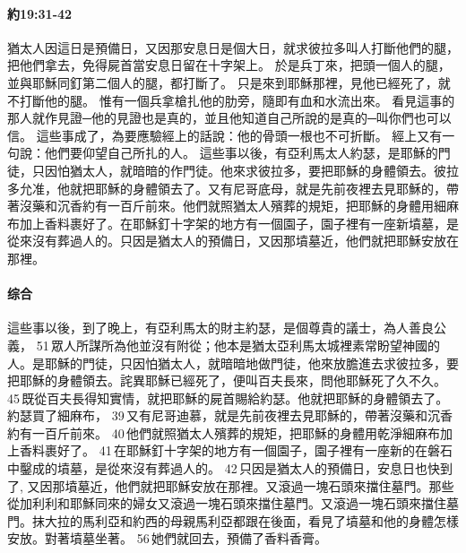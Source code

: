 \paragraph{約19:31-42}
猶太人因這日是預備日，又因那安息日是個大日，就求彼拉多叫人打斷他們的腿，把他們拿去，免得屍首當安息日留在十字架上。
於是兵丁來，把頭一個人的腿，並與耶穌同釘第二個人的腿，都打斷了。
只是來到耶穌那裡，見他已經死了，就不打斷他的腿。
惟有一個兵拿槍扎他的肋旁，隨即有血和水流出來。
看見這事的那人就作見證─他的見證也是真的，並且他知道自己所說的是真的─叫你們也可以信。
這些事成了，為要應驗經上的話說：他的骨頭一根也不可折斷。
經上又有一句說：他們要仰望自己所扎的人。
這些事以後，有亞利馬太人約瑟，是耶穌的門徒，只因怕猶太人，就暗暗的作門徒。他來求彼拉多，要把耶穌的身體領去。彼拉多允准，他就把耶穌的身體領去了。又有尼哥底母，就是先前夜裡去見耶穌的，帶著沒藥和沉香約有一百斤前來。他們就照猶太人殯葬的規矩，把耶穌的身體用細麻布加上香料裹好了。在耶穌釘十字架的地方有一個園子，園子裡有一座新墳墓，是從來沒有葬過人的。只因是猶太人的預備日，又因那墳墓近，他們就把耶穌安放在那裡。
\paragraph{综合}
這些事以後，到了晚上，有亞利馬太的財主約瑟，是個尊貴的議士，為人善良公義， 51 眾人所謀所為他並沒有附從；他本是猶太亞利馬太城裡素常盼望神國的人。是耶穌的門徒，只因怕猶太人，就暗暗地做門徒，他來放膽進去求彼拉多，要把耶穌的身體領去。詫異耶穌已經死了，便叫百夫長來，問他耶穌死了久不久。 45 既從百夫長得知實情，就把耶穌的屍首賜給約瑟。他就把耶穌的身體領去了。約瑟買了細麻布， 39 又有尼哥迪慕，就是先前夜裡去見耶穌的，帶著沒藥和沉香約有一百斤前來。 40 他們就照猶太人殯葬的規矩，把耶穌的身體用乾淨細麻布加上香料裹好了。 41 在耶穌釘十字架的地方有一個園子，園子裡有一座新的在磐石中鑿成的墳墓，是從來沒有葬過人的。 42 只因是猶太人的預備日，安息日也快到了, 又因那墳墓近，他們就把耶穌安放在那裡。又滾過一塊石頭來擋住墓門。那些從加利利和耶穌同來的婦女又滾過一塊石頭來擋住墓門。又滾過一塊石頭來擋住墓門。抹大拉的馬利亞和約西的母親馬利亞都跟在後面，看見了墳墓和他的身體怎樣安放。對著墳墓坐著。 56 她們就回去，預備了香料香膏。


